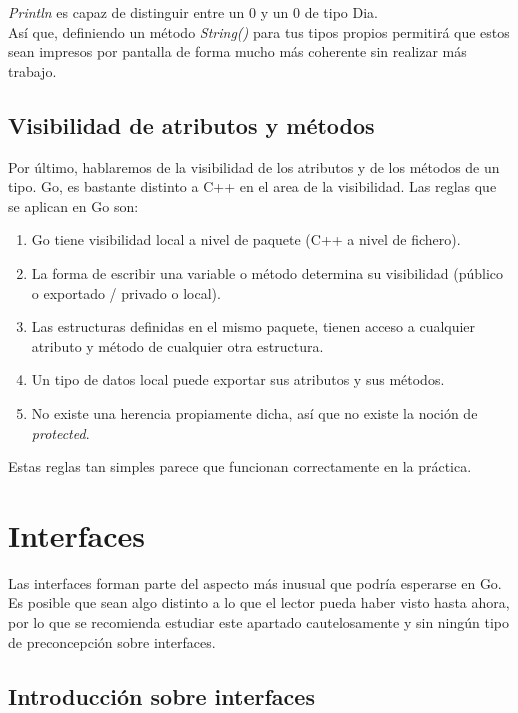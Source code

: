 	\textit{Println} es capaz de distinguir entre un 0 y un 0 de tipo Dia.\\

	Así que, definiendo un método \textit{String()} para tus tipos propios
	permitirá que estos sean impresos por pantalla de forma mucho más coherente
	sin realizar más trabajo.

	\subsection{Visibilidad de atributos y métodos}

	Por último, hablaremos de la visibilidad de los atributos y de los métodos
	de un tipo. Go, es bastante distinto a C++ en el area de la visibilidad. Las
	reglas que se aplican en Go son:

	\begin{enumerate} \item Go tiene visibilidad local a nivel de paquete (C++
	a nivel de fichero).  \item La forma de escribir una variable o método
	determina su visibilidad (público o exportado / privado o local).  \item Las
	estructuras definidas en el mismo paquete, tienen acceso a cualquier
	atributo y método de cualquier otra estructura.  \item Un tipo de datos
	local puede exportar sus atributos y sus métodos.  \item No existe una
	herencia propiamente dicha, así que no existe la noción de
	\textit{protected}.  \end{enumerate}

	Estas reglas tan simples parece que funcionan correctamente en la práctica.

\section{Interfaces}

Las interfaces forman parte del aspecto más inusual que podría esperarse en Go.
Es posible que sean algo distinto a lo que el lector pueda haber visto hasta
ahora, por lo que se recomienda estudiar este apartado cautelosamente y sin
ningún tipo de preconcepción sobre interfaces.

	\subsection{Introducción sobre interfaces}
	
